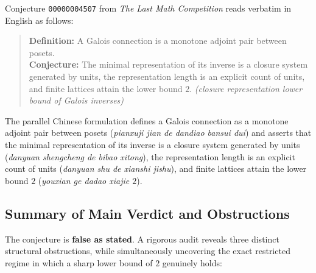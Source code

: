 \documentclass[11pt,a4paper]{article}
\theoremstyle{definition}
\theoremstyle{remark}
\begin{document}
Conjecture \texttt{00000004507} from \emph{The Last Math Competition} reads verbatim in English as follows:
\begin{quote}
\textbf{Definition:} A Galois connection is a monotone adjoint pair between posets.\\
\textbf{Conjecture:} The minimal representation of its inverse is a closure system generated by units, the representation length is an explicit count of units, and finite lattices attain the lower bound $2$. \emph{(closure representation lower bound of Galois inverses)}
\end{quote}
The parallel Chinese formulation defines a Galois connection as a monotone adjoint pair between posets (\emph{pianxuji jian de dandiao bansui dui}) and asserts that the minimal representation of its inverse is a closure system generated by units (\emph{danyuan shengcheng de bibao xitong}), the representation length is an explicit count of units (\emph{danyuan shu de xianshi jishu}), and finite lattices attain the lower bound $2$ (\emph{youxian ge dadao xiajie $2$}).

\subsection{Summary of Main Verdict and Obstructions}

The conjecture is \textbf{false as stated}. A rigorous audit reveals three distinct structural obstructions, while simultaneously uncovering the exact restricted regime in which a sharp lower bound of $2$ genuinely holds:
\end{document}

